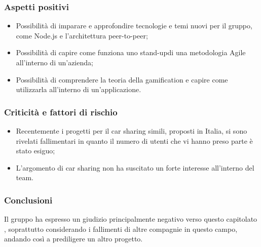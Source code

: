 \subsubsection{Aspetti positivi}
\begin{itemize}
	\item Possibilità di imparare e approfondire tecnologie e temi nuovi per il 
gruppo, come Node.js\glo{} e l'architettura peer-to-peer\glo{};
	\item Possibilità di capire come funziona uno stand-up\glosp di una metodologia Agile\glosp 
all'interno di un'azienda;
	\item Possibilità di comprendere la teoria della gamification\glo{} e capire come 
utilizzarla all'interno di un'applicazione.
\end{itemize}

\subsubsection{Criticità e fattori di rischio}
\begin{itemize}
	\item Recentemente i progetti per il car sharing simili, proposti in Italia, si 
sono rivelati fallimentari in quanto il numero di utenti che vi hanno preso 
parte è stato esiguo;

	\item L'argomento di car sharing non ha suscitato un forte interesse 
all'interno del team.
\end{itemize}
\subsubsection{Conclusioni}
Il gruppo ha espresso un giudizio principalmente negativo verso questo capitolato \glo,
soprattutto considerando i fallimenti di altre compagnie in questo campo, 
andando così a prediligere un altro progetto.
